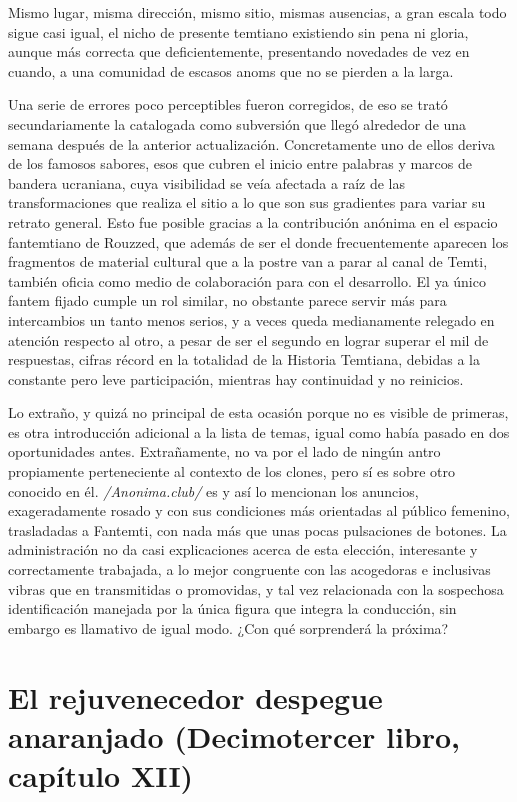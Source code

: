 \documentclass[
]{book}
\begin{document}
Mismo lugar, misma dirección, mismo sitio, mismas ausencias, a gran escala todo sigue casi igual, el nicho de presente temtiano existiendo sin pena ni gloria, aunque más correcta que deficientemente, presentando novedades de vez en cuando, a una comunidad de escasos anoms que no se pierden a la larga.

Una serie de errores poco perceptibles fueron corregidos, de eso se trató secundariamente la catalogada como subversión que llegó alrededor de una semana después de la anterior actualización. Concretamente uno de ellos deriva de los famosos sabores, esos que cubren el inicio entre palabras y marcos de bandera ucraniana, cuya visibilidad se veía afectada a raíz de las transformaciones que realiza el sitio a lo que son sus gradientes para variar su retrato general. Esto fue posible gracias a la contribución anónima en el espacio fantemtiano de Rouzzed, que además de ser el donde frecuentemente aparecen los fragmentos de material cultural que a la postre van a parar al canal de Temti, también oficia como medio de colaboración para con el desarrollo. El ya único fantem fijado cumple un rol similar, no obstante parece servir más para intercambios un tanto menos serios, y a veces queda medianamente relegado en atención respecto al otro, a pesar de ser el segundo en lograr superar el mil de respuestas, cifras récord en la totalidad de la Historia Temtiana, debidas a la constante pero leve participación, mientras hay continuidad y no reinicios.

Lo extraño, y quizá no principal de esta ocasión porque no es visible de primeras, es otra introducción adicional a la lista de temas, igual como había pasado en dos oportunidades antes. Extrañamente, no va por el lado de ningún antro propiamente perteneciente al contexto de los clones, pero sí es sobre otro conocido en él. \emph{/Anonima.club/} es y así lo mencionan los anuncios, exageradamente rosado y con sus condiciones más orientadas al público femenino, trasladadas a Fantemti, con nada más que unas pocas pulsaciones de botones. La administración no da casi explicaciones acerca de esta elección, interesante y correctamente trabajada, a lo mejor congruente con las acogedoras e inclusivas vibras que en transmitidas o promovidas, y tal vez relacionada con la sospechosa identificación manejada por la única figura que integra la conducción, sin embargo es llamativo de igual modo. ¿Con qué sorprenderá la próxima?

\hypertarget{el-rejuvenecedor-despegue-anaranjado-decimotercer-libro-capuxedtulo-xii}{%
\section{El rejuvenecedor despegue anaranjado (Decimotercer libro, capítulo XII)}\label{el-rejuvenecedor-despegue-anaranjado-decimotercer-libro-capuxedtulo-xii}}
\end{document}
